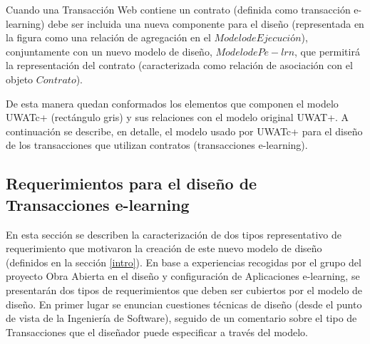 Cuando una Transacción Web contiene un contrato (definida como transacción
e-learning) debe ser incluida una nueva componente para el diseño (representada
en la figura como una relación de agregación en el $Modelo de Ejecución$),
conjuntamente con un nuevo modelo de diseño, $Modelo de Pe-lrn$, que permitirá
la representación del contrato (caracterizada como relación de asociación con el
objeto $Contrato$).

De esta manera quedan conformados los elementos que componen el modelo UWATc+
(rectángulo gris) y sus relaciones con el modelo original UWAT+. A continuación
se describe, en detalle, el modelo usado por UWATc+ para el diseño de los
transacciones que utilizan contratos (transacciones e-learning). 


\subsection{Requerimientos para el diseño de Transacciones e-learning}

En esta sección se describen la caracterización de dos tipos representativo de
requerimiento que motivaron la creación de este nuevo modelo de diseño
(definidos en la sección \ref{intro}). En base a experiencias recogidas por el
grupo del proyecto Obra Abierta en el diseño y configuración de Aplicaciones
e-learning, se presentarán dos tipos de requerimientos que deben ser cubiertos
por el modelo de diseño. En primer lugar se enuncian cuestiones técnicas de
diseño (desde el punto de vista de la Ingeniería de Software), seguido de un
comentario sobre el tipo de Transacciones que el diseñador puede especificar a
través del modelo.

